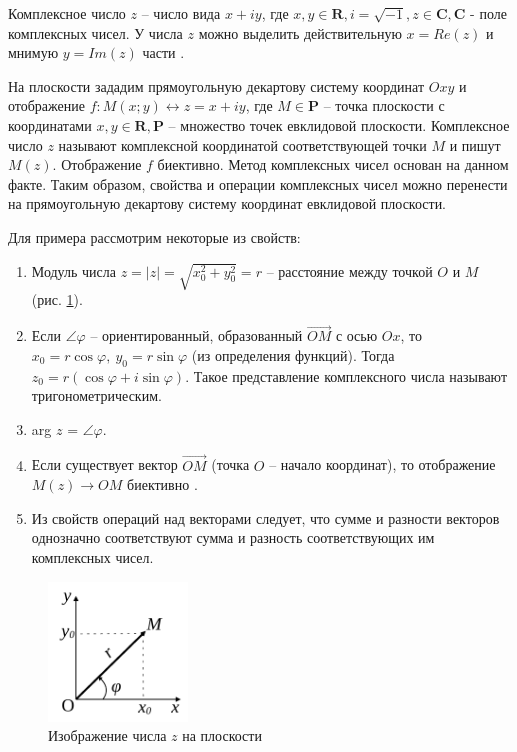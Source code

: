 Комплексное число \(z\) -- число вида $x + iy$, где $x,y \in \mathbf{R}, i = \sqrt{-1},z \in \mathbf{C},
   \mathbf{C}$ - поле комплексных чисел. У числа \(z\) можно выделить действительную $x = Re(z)$ и
мнимую $y=Im(z)$ части \cite[стр. 357]{book:semendyaev}.

На плоскости зададим прямоугольную декартову систему координат \(Oxy\) и отображение $f: M(x;y)
   \leftrightarrow z = x + iy$, где $M \in \mathbf{P}$ -- точка плоскости с координатами $x,y \in
   \mathbf{R}, \mathbf{P}$ -- множество точек евклидовой плоскости. Комплексное число $z$ называют
комплексной координатой соответствующей точки $M$ и пишут \(M(z)\).
Отображение \(f\) биективно. Метод комплексных чисел основан на данном факте. Таким образом,
свойства и операции комплексных чисел можно перенести на прямоугольную декартову систему
координат евклидовой плоскости.

Для примера рассмотрим некоторые из свойств:
\begin{enumerate}
   \item Модуль числа $z = \vert z\vert = \sqrt{x_0^2+y_0^2} = r$ -- расстояние между точкой
         \(O\) и \(M\) (рис. \ref{theory-1}).
   \item Если $\angle \varphi$ -- ориентированный, образованный $\overrightarrow{OM}$
         с осью \(Ox\), то $x_0 = r\cos \varphi,~y_0 = r\sin \varphi$ (из определения функций).
         Тогда $z_0 = r(\cos \varphi + i \sin \varphi)$. Такое представление комплексного
         числа называют тригонометрическим.
   \item arg $z$ = $\angle \varphi$.
   \item Если существует вектор \(\overrightarrow{OM}\) (точка \(O\) -- начало координат),
         то отображение \(M(z) \rightarrow OM\) биективно \cite[стр. 32]{book:jaglom}.
   \item Из свойств операций над векторами следует, что сумме и разности векторов однозначно
         соответствуют сумма и разность соответствующих им комплексных чисел.
         \label{theory-properties}
\end{enumerate}
\begin{figure}[ht]
   \centering
   \includegraphics[width=0.33\textwidth]{images/theory-1}
   \caption{Изображение числа \(z\) на плоскости}
   \label{theory-1}
\end{figure}

